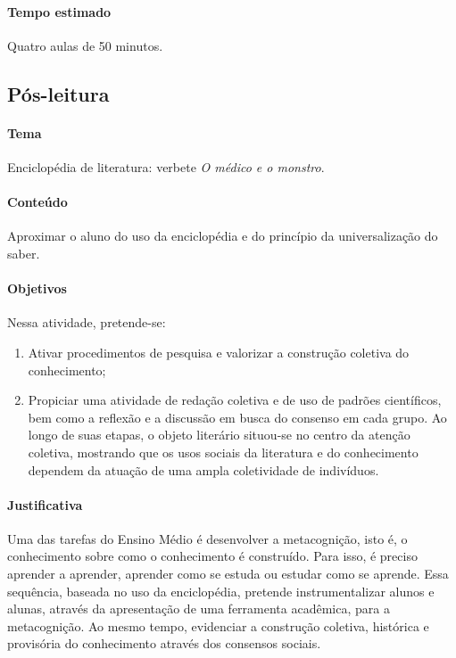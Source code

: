 \documentclass[12pt]{extarticle}
\begin{document}
{\paragraph{Tempo estimado} Quatro aulas de 50 minutos.

\subsection{Pós-leitura} 

\paragraph{Tema} Enciclopédia de literatura: verbete \emph{O médico e o
monstro}.


\paragraph{Conteúdo} Aproximar o aluno do uso da enciclopédia e do princípio da universalização do saber.

\paragraph{Objetivos}
Nessa atividade, pretende-se:
\begin{enumerate} 
\item
Ativar procedimentos de pesquisa e
valorizar a construção coletiva do conhecimento; 

\item
Propiciar uma atividade de redação coletiva e de uso de padrões científicos, bem como a reflexão e a discussão em busca do consenso em cada grupo. Ao longo de
suas etapas, o objeto literário situou-se no centro da atenção coletiva,
mostrando que os usos sociais da literatura e do conhecimento dependem
da atuação de uma ampla coletividade de indivíduos.
\end{enumerate}

\paragraph{Justificativa}
Uma das tarefas do Ensino Médio é desenvolver a metacognição, isto é, o
conhecimento sobre como o conhecimento é construído. Para isso, é
preciso aprender a aprender, aprender como se estuda ou estudar como se
aprende. Essa sequência, baseada no uso da enciclopédia, pretende
instrumentalizar alunos e alunas, através da apresentação de uma
ferramenta acadêmica, para a metacognição. Ao mesmo tempo, evidenciar a
construção coletiva, histórica e provisória do conhecimento através dos
consensos sociais.

}
\end{document}
